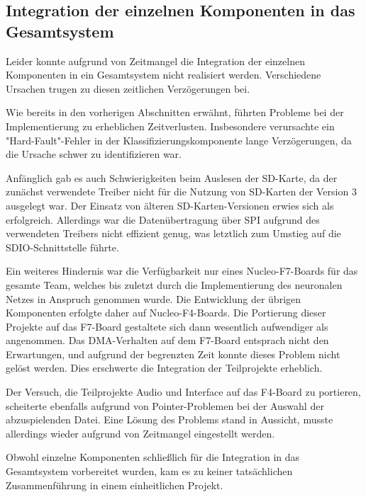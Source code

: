 





\subsection{Integration der einzelnen Komponenten in das Gesamtsystem}
\label{sec:no-gesamtintegration}
\vspace{1em}

Leider konnte aufgrund von Zeitmangel die Integration der einzelnen Komponenten in ein Gesamtsystem nicht realisiert werden. Verschiedene Ursachen trugen zu diesen zeitlichen Verzögerungen bei.

Wie bereits in den vorherigen Abschnitten erwähnt, führten Probleme bei der Implementierung zu erheblichen Zeitverlusten. Insbesondere verursachte ein "Hard-Fault"-Fehler in der Klassifizierungskomponente lange Verzögerungen, da die Ursache schwer zu identifizieren war.

Anfänglich gab es auch Schwierigkeiten beim Auslesen der SD-Karte, da der zunächst verwendete Treiber\cite{spi-sd-card} nicht für die Nutzung von SD-Karten der Version 3 ausgelegt war. Der Einsatz von älteren SD-Karten-Versionen erwies sich als erfolgreich. Allerdings war die Datenübertragung über SPI aufgrund des verwendeten Treibers nicht effizient genug, was letztlich zum Umstieg auf die SDIO-Schnittstelle führte.

Ein weiteres Hindernis war die Verfügbarkeit nur eines Nucleo-F7-Boards für das gesamte Team, welches bis zuletzt durch die Implementierung des neuronalen Netzes in Anspruch genommen wurde. Die Entwicklung der übrigen Komponenten erfolgte daher auf Nucleo-F4-Boards. Die Portierung dieser Projekte auf das F7-Board gestaltete sich dann wesentlich aufwendiger als angenommen. Das DMA-Verhalten auf dem F7-Board entsprach nicht den Erwartungen, und aufgrund der begrenzten Zeit konnte dieses Problem nicht gelöst werden. Dies erschwerte die Integration der Teilprojekte erheblich.

Der Versuch, die Teilprojekte Audio und Interface auf das F4-Board zu portieren, scheiterte ebenfalls aufgrund von Pointer-Problemen bei der Auswahl der abzuspielenden Datei. Eine Lösung des Problems stand in Aussicht, musste allerdings wieder aufgrund von Zeitmangel eingestellt werden.

Obwohl einzelne Komponenten schließlich für die Integration in das Gesamtsystem vorbereitet wurden, kam es zu keiner tatsächlichen Zusammenführung in einem einheitlichen Projekt.

